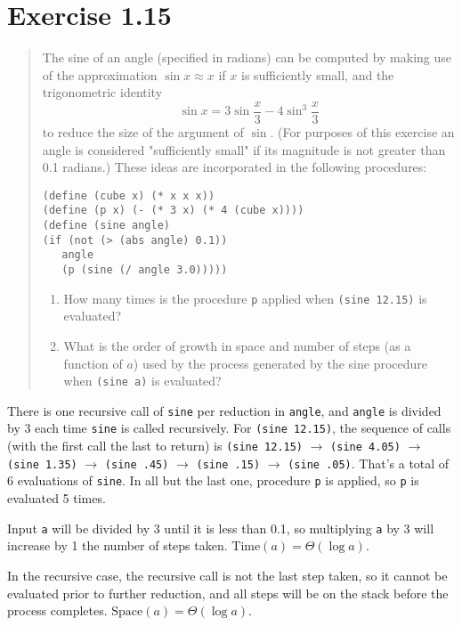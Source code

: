 \documentclass{article}
\begin{document}
\section{Exercise 1.15}
\begin{quote}
    The sine of an angle (specified in radians) can be computed by making use
    of the approximation $\sin{x}\approx x$ if $x$ is sufficiently small, and
    the trigonometric identity
    \begin{equation*}
        \sin x = 3\sin\frac{x}{3}-4\sin^3\frac{x}{3}
    \end{equation*}
    to reduce the size of the argument of $\sin$. (For purposes of this
    exercise an angle is considered "sufficiently small" if its magnitude is
    not greater than 0.1 radians.) These ideas are incorporated in the
    following procedures:
    \begin{lstlisting}
(define (cube x) (* x x x))
(define (p x) (- (* 3 x) (* 4 (cube x))))
(define (sine angle)
(if (not (> (abs angle) 0.1))
   angle
   (p (sine (/ angle 3.0)))))
    \end{lstlisting}
    \begin{enumerate}
        \item How many times is the procedure \verb|p| applied when
            \texttt{(sine 12.15)} is evaluated?
        \item What is the order of growth in space and number of steps (as a
            function of $a$) used by the process generated by the sine
            procedure when \texttt{(sine a)} is evaluated?
    \end{enumerate}
\end{quote}

There is one recursive call of \texttt{sine} per reduction in \texttt{angle},
and \texttt{angle} is divided by 3 each time \texttt{sine} is called
recursively. For \texttt{(sine 12.15)}, the sequence of calls (with the first
call the last to return) is \texttt{(sine 12.15)} $\rightarrow$ \texttt{(sine
4.05)} $\rightarrow$ \texttt{(sine 1.35)} $\rightarrow$ \texttt{(sine .45)}
$\rightarrow$ \texttt{(sine .15)} $\rightarrow$ \texttt{(sine .05)}. That's a
total of 6 evaluations of \texttt{sine}. In all but the last one, procedure
\texttt{p} is applied, so \texttt{p} is evaluated 5 times.

Input \texttt{a} will be divided by 3 until it is less than 0.1, so multiplying
\texttt{a} by 3 will increase by 1 the number of steps taken.
$\textrm{Time}(a)=\Theta(\log a)$.

In the recursive case, the recursive call is not the last step taken, so it
cannot be evaluated prior to further reduction, and all steps will be on the
stack before the process completes. $\textrm{Space}(a)=\Theta(\log a)$.
\end{document}
